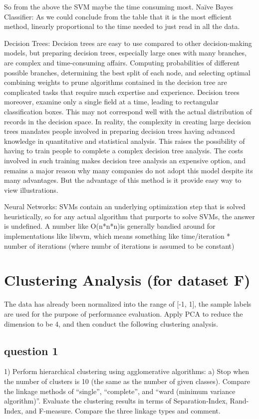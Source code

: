 \documentclass[]{article}
\begin{document}
So from the above the SVM maybe the time consuming most.
Naïve Bayes Classifier: As we could conclude from the table that it is the most efficient method, linearly proportional to the time needed to just read in all the data.

Decision Trees: Decision trees are easy to use compared to other decision-making models, but preparing decision trees, especially large ones with many branches, are complex and time-consuming affairs.
Computing probabilities of different possible branches, determining the best split of each node, and selecting optimal combining weights to prune algorithms contained in the decision tree are complicated tasks that require much expertise and experience.
Decision trees moreover, examine only a single field at a time, leading to rectangular classification boxes. This may not correspond well with the actual distribution of records in the decision space.
In reality, the complexity in creating large decision trees mandates people involved in preparing decision trees having advanced knowledge in quantitative and statistical analysis. This raises the possibility of having to train people to complete a complex decision tree analysis. The costs involved in such training makes decision tree analysis an expensive option, and remains a major reason why many companies do not adopt this model despite its many advantages. But the advantage of this method is it provide easy way to view illustrations.


Neural Networks:  SVMs contain an underlying optimization step that is solved heuristically, so for any actual algorithm that purports to solve SVMs, the answer is undefined. A number like
O(n*n*n)is generally bandied around for implementations like libsvm, which means something like time/iteration * number of iterations (where numbr of  iterations is assumed to be constant)



\section{Clustering Analysis (for dataset F)}
The data has already been normalized into the range of [-1, 1], the sample labels are used for the purpose of performance evaluation.
Apply PCA to reduce the dimension to be 4, and then conduct the following clustering analysis.
\subsection{question 1}
1) Perform hierarchical clustering using agglomerative algorithms:
a) Stop when the number of clusters is 10 (the same as the number of given classes). Compare the linkage methods of “single”, “complete”, and “ward (minimum variance algorithm)”. Evaluate the clustering results in terms of Separation-Index, Rand-Index, and F-measure. Compare the three linkage types and comment.
\end{document}
